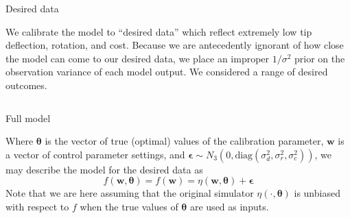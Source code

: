 \documentclass[final]{beamer}
\newlength{\onecolwid}
\newlength{\twocolwid}
\begin{document}
\begin{frame}[t]
\begin{columns}[t]
\begin{column}{\twocolwid}
\begin{columns}[t,totalwidth=\twocolwid]
\begin{column}{\onecolwid}

\begin{alertblock}{Desired data}

We calibrate the model to ``desired data'' which reflect extremely low tip deflection, rotation, and cost. Because we are antecedently ignorant of how close the model can come to our desired data, we place an improper $1/\sigma^2$ prior on the observation variance of each model output. We considered a range of desired outcomes.

\end{alertblock}

\end{column} %

\end{columns} %



\begin{alertblock}{Full model}

Where $\boldsymbol \theta$ is the vector of true (optimal) values of the calibration parameter, $\mathbf w$ is a vector of control parameter settings, and $\boldsymbol \epsilon\sim N_3(0,\mathrm{diag}(\sigma^2_d,\sigma^2_r,\sigma^2_c))$, we may describe the model for the desired data as
\[
f(\mathbf w,\boldsymbol \theta) = f(\mathbf w) = \eta(\mathbf w,\boldsymbol \theta) + \boldsymbol \epsilon
\]
Note that we are here assuming that the original simulator $\eta(\cdot,\boldsymbol\theta)$ is unbiased with respect to $f$ when the true values of $\boldsymbol\theta$ are used as inputs.

\end{alertblock} 





\end{column}
\end{columns}
\end{frame}
\end{document}
